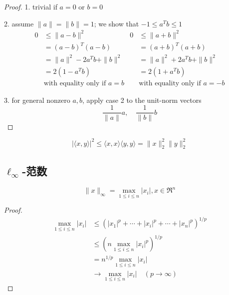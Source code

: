 \begin{proof}
    1. trivial if $ a=0 $ or $ b=0 $

2. assume $ \|a\|=\|b\|=1 $; we show that $ -1 \leq a^{T} b \leq 1 $
\begin{equation}
\begin{array}{rlrl}
0 & \leq\|a-b\|^{2} & 0 & \leq\|a+b\|^{2} \\
& =(a-b)^{T}(a-b) & & =(a+b)^{T}(a+b) \\
& =\|a\|^{2}-2 a^{T} b+\|b\|^{2} & & =\|a\|^{2}+2 a^{T} b+\|b\|^{2} \\
& =2\left(1-a^{T} b\right) & & =2\left(1+a^{T} b\right)\\
 & \text{with equality only if }a=b &  & \text{with equality only if }a=-b
\end{array}
\end{equation}

3. for general nonzero $ a, b $, apply case 2 to the unit-norm vectors
\begin{equation}
\frac{1}{\|a\|} a, \quad \frac{1}{\|b\|} b
\end{equation}
\end{proof}



\begin{corollary}
    \begin{equation} |\langle x, y\rangle|^{2} \leq\langle x, x\rangle\langle y, y\rangle=\|x\|_{2}^{2}\|y\|_{2}^{2} \end{equation}
\end{corollary}



\subsection{$ \ell_{\infty} $-范数}

\begin{definition}
    \begin{equation} \|x\|_{\infty}=\max _{1 \leq i \leq n}\left|x_{i}\right|, x \in \mathfrak{R}^{n} \end{equation}
\end{definition}

\begin{proof}
    \begin{equation} \begin{aligned} \max _{1 \leq i \leq n}\left|x_{i}\right| 
        &\leq \left(\left|x_{1}\right|^{p}+\cdots+\left|x_{i}\right|^{p}+\cdots+\left|x_{n}\right|^{p}\right)^{1 / p} \\
        &\leq \left(n \max _{1 \leq i \leq n}\left|x_{i}\right|^{p}\right)^{1 / p}\\
        &  =n^{1 / p} \max _{1 \leq i \leq n}\left|x_{i}\right| \\ &\rightarrow \max _{1 \leq i \leq n}\left|x_{i}\right| \quad(p \rightarrow \infty)\end{aligned}
    \end{equation}
\end{proof}


